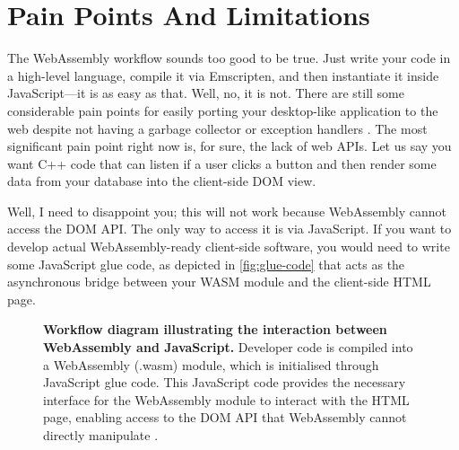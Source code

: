 \documentclass[10pt]{article}
\begin{document}
\begin{sloppypar}
  \section{Pain Points And Limitations}
  \label{sec:pain-points-and-limitations}

  The WebAssembly workflow sounds too good to be true. Just write your code in a high-level language, compile it via Emscripten, and then instantiate it inside JavaScript—it is as easy as that. Well, no, it is not. There are still some considerable pain points for easily porting your desktop-like application to the web despite not having a garbage collector or exception handlers \citep{w3c_roadmap_2019}. The most significant pain point right now is, for sure, the lack of web APIs. Let us say you want C++ code that can listen if a user clicks a button and then render some data from your database into the client-side DOM view.

  Well, I need to disappoint you; this will not work because WebAssembly cannot access the DOM API. The only way to access it is via JavaScript. If you want to develop actual WebAssembly-ready client-side software, you would need to write some JavaScript glue code, as depicted in \autoref{fig:glue-code} \citep{mihaylov_how_2018} that acts as the asynchronous bridge between your WASM module and the client-side HTML page.

  \begin{figure}[ht]
    \centering
    \caption[Workflow diagram illustrating the interaction between WebAssembly and JavaScript.]{\textbf{Workflow diagram illustrating the interaction between WebAssembly and JavaScript.} Developer code is compiled into a WebAssembly (.wasm) module, which is initialised through JavaScript glue code. This JavaScript code provides the necessary interface for the WebAssembly module to interact with the HTML page, enabling access to the DOM API that WebAssembly cannot directly manipulate \citep{mihaylov_how_2018}.}
    \label{fig:glue-code}
  \end{figure}


\end{sloppypar}
\end{document}
